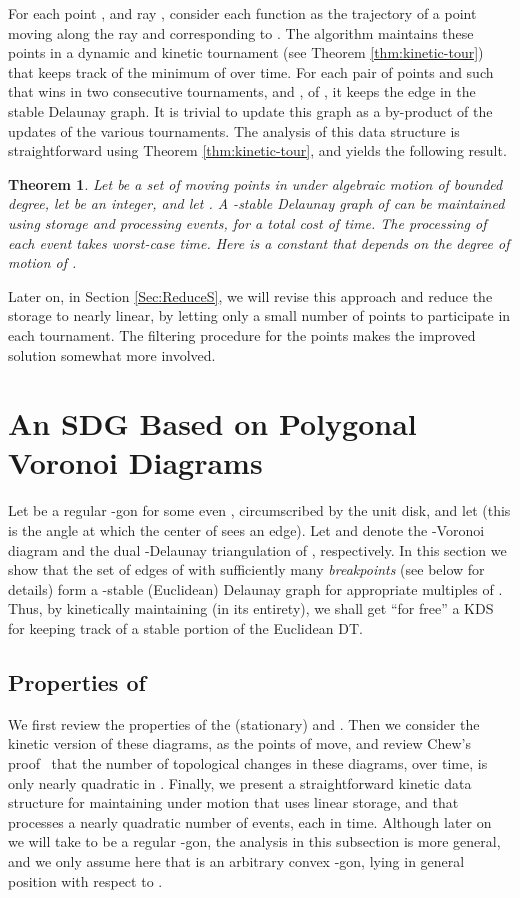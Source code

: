 \documentclass[letter,11pt]{article}
\newtheorem{theorem}{Theorem}[section]
\begin{document}
For each point , and ray , 
consider each function   as the
trajectory of a point moving
along the ray and corresponding to . The algorithm maintains
these points in a dynamic and kinetic tournament  
(see Theorem \ref{thm:kinetic-tour}) that keeps track of the 
minimum of  over time.
For each pair of points  and  such that 
 wins in two consecutive tournaments,  and , of ,
 it keeps the edge  in
the stable Delaunay graph. It is trivial to update this graph as a by-product of the updates of the various tournaments.
The analysis of this
data structure is straightforward using Theorem \ref{thm:kinetic-tour},
and yields the following result.
\begin{theorem} \label{thm:ddj}
Let  be a set of  moving points in  under algebraic
motion of bounded degree, let  be an integer, and let .
A -stable Delaunay graph
of  can be maintained using
 storage and processing
  events, for a total cost
of  time.
The processing of each event takes
 worst-case time.
Here  is a constant that depends on the degree of motion of .
\end{theorem}

Later on, in Section \ref{Sec:ReduceS}, we will revise this approach and reduce the storage to nearly linear, by letting only 
a small number of points to participate in each tournament. The filtering procedure for the points makes the improved solution 
somewhat more involved.
\section{An SDG Based on Polygonal Voronoi Diagrams}
\label{sec:ViaPolygonal}
\label{Sec:polygProp}


Let  be a regular -gon
 for some even , circumscribed by the unit disk, and let  (this is the angle at which the center of  sees an edge). 
Let  and  denote the -Voronoi diagram and
the dual -Delaunay triangulation of , respectively.
In this section we show that the set of
edges of  with sufficiently many \textit{breakpoints} (see below for details) form a
-stable (Euclidean) Delaunay graph for appropriate multiples
 of .
Thus, by kinetically maintaining  (in its entirety),
we shall get ``for free'' a KDS for keeping track of a stable portion 
of the Euclidean DT.

\subsection{Properties of }
\label{Sec:PolygonalBackground}
We first review the properties of the (stationary)
 and . Then we consider the
kinetic version of these diagrams, as the points of  move, and
review Chew's proof~\cite{Chew} that the number of topological
changes in these diagrams, over time, is only nearly quadratic
in . Finally, we present a straightforward kinetic data structure 
for maintaining  under motion that uses linear storage, 
and that processes a nearly quadratic number of events, 
each in  time. 
Although later on we will take  to be a regular -gon, the analysis in this subsection is more general, and we only assume here that  is an arbitrary convex -gon, lying in general position with respect to .
\end{document}
